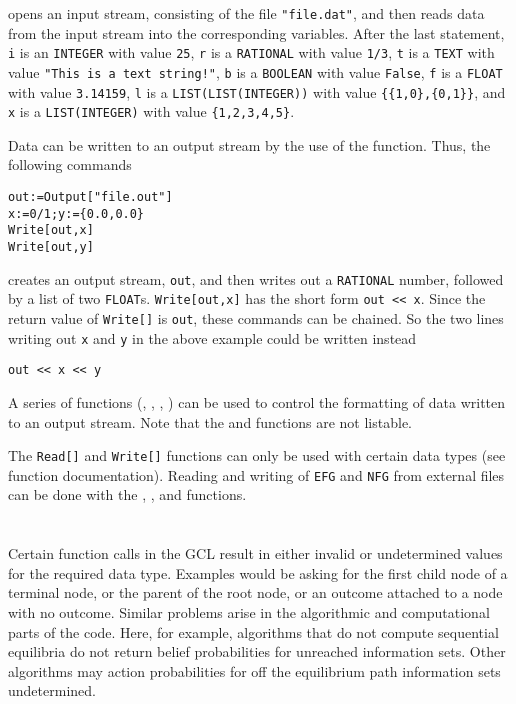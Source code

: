 \noindent
opens an input stream, consisting of the file \verb+"file.dat"+, and
then reads data from the input stream into the corresponding
variables.  After the last statement, 
\verb+i+ is an \verb+INTEGER+ with value \verb+25+, 
\verb+r+ is a \verb+RATIONAL+ with value \verb+1/3+, 
\verb+t+ is a \verb+TEXT+ with value \verb+"This is a text string!"+, 
\verb+b+ is a \verb+BOOLEAN+ with value \verb+False+, 
\verb+f+ is a \verb+FLOAT+ with value \verb+3.14159+, 
\verb+l+ is a \verb+LIST(LIST(INTEGER))+ with value \verb+{{1,0},{0,1}}+, and 
\verb+x+ is a \verb+LIST(INTEGER)+ with value \verb+{1,2,3,4,5}+.  

Data can be written to an output stream by the use of the
 function.  Thus, the following commands

\begin{verbatim}
out:=Output["file.out"]
x:=0/1;y:={0.0,0.0}
Write[out,x]
Write[out,y]
\end{verbatim}

\noindent
creates an output stream, \verb+out+, and then writes out a
\verb+RATIONAL+ number, followed by a list of two \verb+FLOAT+s.
\verb+Write[out,x]+ has the short form \verb+out << x+.  Since the
return value of \verb+Write[]+ is \verb+out+, these commands can be
chained.  So the two lines writing out \verb+x+ and \verb+y+ in the
above example could be written instead

\begin{verbatim}
out << x << y
\end{verbatim}
 
A series of  functions (,
, , )
can be used to control the formatting of data written to an output
stream.  Note that the  and  functions are
not listable.

The \verb+Read[]+ and \verb+Write[]+ functions can only be used with
certain data types (see function documentation).  Reading and writing
of \verb+EFG+ and \verb+NFG+ from external files can be done with the
, ,  and
 functions.

\section{}

Certain function calls in the GCL result in either invalid or
undetermined values for the required data type. Examples would be
asking for the first child node of a terminal node, or the parent of
the root node, or an outcome attached to a node with no outcome.
Similar problems arise in the algorithmic and computational parts of
the code.  Here, for example, algorithms that do not compute
sequential equilibria do not return belief probabilities for unreached
information sets.  Other algorithms may action probabilities for off
the equilibrium path information sets undetermined.  

